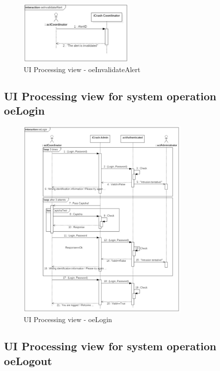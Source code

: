 \begin{figure}[h]
	\centering	
	\captionsetup{justification=centering}
	\includegraphics[width=0.5\textwidth]{./images/ui_oeInvalidateAlert.eps}
	\caption{UI Processing view - oeInvalidateAlert}
\end{figure}


\subsection{UI Processing view for system operation oeLogin}

\begin{figure}[h]
	\centering	
	\captionsetup{justification=centering}
	\includegraphics[width=0.75\textwidth]{./images/ui_oeLogin.eps}
	\caption{UI Processing view - oeLogin}
\end{figure}


\subsection{UI Processing view for system operation oeLogout}

